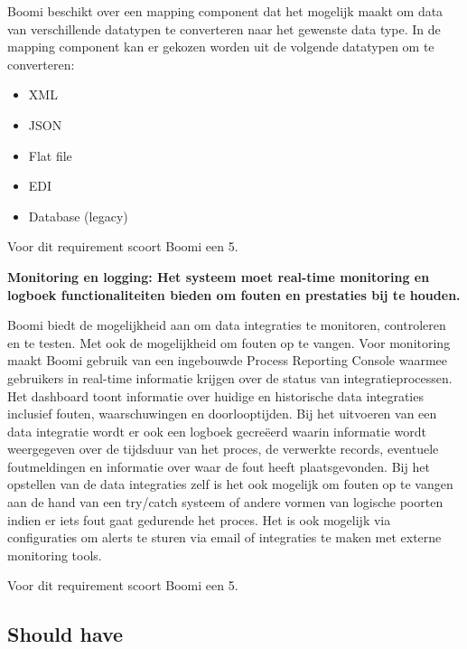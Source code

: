\vspace{\baselineskip}

Boomi beschikt over een mapping component dat het mogelijk maakt om data van verschillende datatypen te converteren naar het gewenste data type. In de mapping component kan er gekozen worden uit de volgende datatypen om te converteren:

\begin{itemize}
    \item XML
    \item JSON
    \item Flat file
    \item EDI
    \item Database (legacy)
\end{itemize}

Voor dit requirement scoort Boomi een 5.


\vspace{\baselineskip}


\textbf{Monitoring en logging: Het systeem moet real-time monitoring en logboek functionaliteiten bieden om fouten en prestaties bij te houden.}

\vspace{\baselineskip}

Boomi biedt de mogelijkheid aan om data integraties te monitoren, controleren en te testen. Met ook de mogelijkheid om fouten op te vangen. Voor monitoring maakt Boomi gebruik van een ingebouwde Process Reporting Console waarmee gebruikers in real-time informatie krijgen over de status van integratieprocessen. Het dashboard toont informatie over huidige en historische data integraties inclusief fouten, waarschuwingen en doorlooptijden. Bij het uitvoeren van een data integratie wordt er ook een logboek gecreëerd waarin informatie wordt weergegeven over de tijdsduur van het proces, de verwerkte records, eventuele foutmeldingen en informatie over waar de fout heeft plaatsgevonden. Bij het opstellen van de data integraties zelf is het ook mogelijk om fouten op te vangen aan de hand van een try/catch systeem of andere vormen van logische poorten indien er iets fout gaat gedurende het proces. Het is ook mogelijk via configuraties om alerts te sturen via email of integraties te maken met externe monitoring tools.

Voor dit requirement scoort Boomi een 5.


\vspace{\baselineskip}

\subsection{Should have}%
\label{ShouldHaveBoomi}


